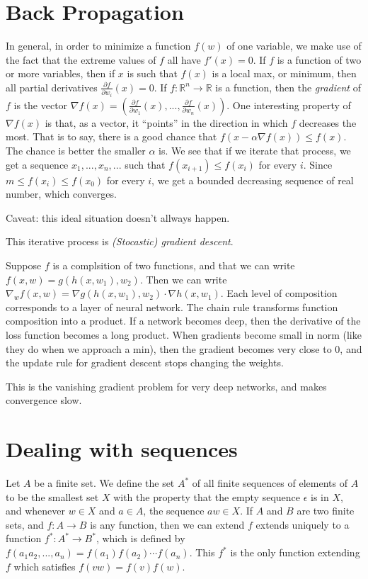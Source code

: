 \documentclass[10pt]{amsart}
\newcommand{\R}{\mathbb{R}}
\theoremstyle{definition}
\begin{document}
\section{Back Propagation}

In general, in order to minimize a function $f(w)$ of one variable, we make use of the fact that
the extreme values of $f$ all have $f'(x)=0$.  If $f$ is a function of two or more variables, then
if $x$ is such that $f(x)$ is a local max, or minimum, then all partial derivatives
$\frac{\partial f}{\partial w_i}(x)=0$.  If $f:\R^n\to\R$ is a function, then the
{\em gradient} of $f$ is the vector
$\nabla f(x) = \left(\frac{\partial f}{\partial w_1}(x),...,\frac{\partial f}{\partial w_n}(x)\right)$.
One interesting property of $\nabla f(x)$ is that, as a vector, it ``points'' in the direction in which
$f$ decreases the most.  That is to say, there is a good chance that $f(x-\alpha\nabla f(x))\leq f(x)$.
The chance is better the smaller $\alpha$ is.  We see that if we iterate that process, we get a
sequence $x_1,...,x_n,...$ such that $f(x_{i+1})\leq f(x_i)$ for every $i$.  Since $m\leq f(x_i)\leq f(x_0)$
for every $i$, we get a bounded decreasing sequence of real number, which converges.

Caveat: this ideal situation doesn't allways happen.

This iterative process is {\em (Stocastic) gradient descent}.

Suppose $f$ is a complsition of two functions, and that we can write $f(x,w)= g(h(x, w_1), w_2)$.
Then we can write $\nabla_w f(x, w)=\nabla g(h(x, w_1), w_2)\cdot \nabla h(x, w_1)$. Each level
of composition corresponds to a layer of neural network.  The chain rule transforms function composition
into a product. If a network becomes deep, then the derivative of the loss function becomes a long
product.  When gradients become small in norm (like they do when we approach a min), then the gradient
becomes very close to $0$, and the update rule for gradient descent stops changing the weights.

This is the vanishing gradient problem for very deep networks, and makes convergence slow.

\section{Dealing with sequences}

Let $A$ be a finite set. We define the set $A^*$ of all finite sequences of elements of $A$ to be the smallest set $X$ with the property that the empty sequence $\epsilon$ is in $X$, and whenever $w\in X$ and $a\in A$, the sequence $aw\in X$. If $A$ and $B$ are two finite sets, and $f:A\to B$ is any function, then we can extend $f$ extends uniquely to a function $f^*:A^*\to B^*$, which is defined by $f(a_1a_2,...,a_n)=f(a_1)f(a_2)\cdots f(a_n)$. This $f^*$ is the only function extending $f$ which satisfies $f(vw)=f(v)f(w)$.
\end{document}
